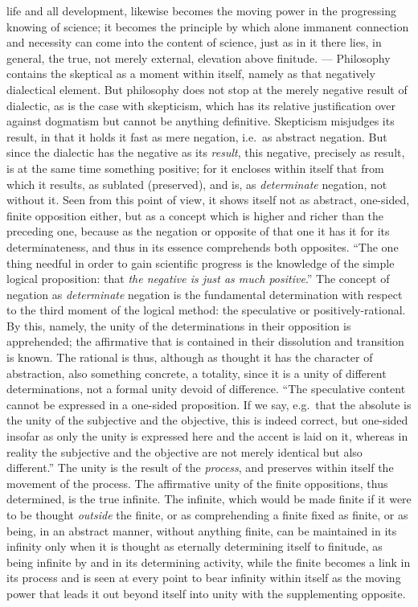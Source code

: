 life and all development, likewise becomes the moving power in the
progressing knowing of science; it becomes the principle by which alone
immanent connection and necessity can come into the content of science,
just as in it there lies, in general, the true, not merely external,
elevation above finitude. --- Philosophy contains the skeptical as a
moment within itself, namely as that negatively dialectical element. But
philosophy does not stop at the merely negative result of dialectic, as
is the case with skepticism, which has its relative justification over
against dogmatism but cannot be anything definitive. Skepticism
misjudges its result, in that it holds it fast as mere negation, i.e.\
as abstract negation. But since the dialectic has the negative as its
\emph{result}, this negative, precisely as result, is at the same time
something positive; for it encloses within itself that from which it
results, as sublated (preserved), and is, as \emph{determinate}
negation, not without it. Seen from this point of view, it shows itself
not as abstract, one-sided, finite opposition either, but as a concept
which is higher and richer than the preceding one, because as the
negation or opposite of that one it has it for its determinateness, and
thus in its essence comprehends both opposites. ``The one thing needful
in order to gain scientific progress is the knowledge of the simple
logical proposition: that \emph{the negative is just as much
positive}.'' The concept of negation as \emph{determinate} negation is
the fundamental determination with respect to the third moment of the
logical method: the speculative or positively-rational. By this,
namely, the unity of the determinations in their opposition is
apprehended; the affirmative that is contained in their dissolution and
transition is known. The rational is thus, although as thought it has
the character of abstraction, also something concrete, a totality,
since it is a unity of different determinations, not a formal unity
devoid of difference. ``The speculative content cannot be expressed in
a \opage{256}one-sided proposition. If we say, e.g.\ that the absolute
is the unity of the subjective and the objective, this is indeed
correct, but one-sided insofar as only the unity is expressed here and
the accent is laid on it, whereas in reality the subjective and the
objective are not merely identical but also different.'' The unity is
the result of the \emph{process}, and preserves within itself the
movement of the process. The affirmative unity of the finite
oppositions, thus determined, is the true infinite. The infinite, which
would be made finite if it were to be thought \emph{outside} the
finite, or as comprehending a finite fixed as finite, or as being, in an
abstract manner, without anything finite, can be maintained in its
infinity only when it is thought as eternally determining itself to
finitude, as being infinite by and in its determining activity, while
the finite becomes a link in its process and is seen at every point to
bear infinity within itself as the moving power that leads it out
beyond itself into unity with the supplementing opposite.

